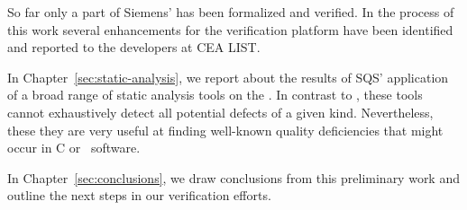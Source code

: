 So far only a part of Siemens' \bitwalker has been formalized and verified.
In the process of this work several enhancements for the \framac verification platform
have been identified and reported to the developers at {CEA LIST}.

In Chapter~\ref{sec:static-analysis}, we report about the results of
SQS' application of a broad range of static analysis tools on the \bitwalker. 
In contrast to \framac, these tools cannot exhaustively
detect all potential defects of a given kind.
Nevertheless, these they are very useful at finding well-known quality deficiencies that
might occur in C or \CC\ software.

In Chapter~\ref{sec:conclusions}, we draw conclusions from this preliminary work
and outline the next steps in our verification efforts.

